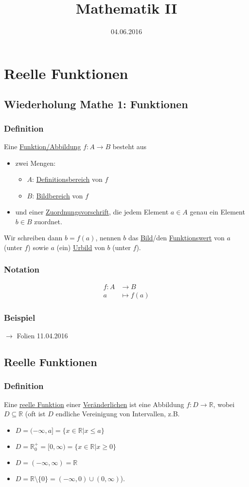 \documentclass[12pt, titlepage]{article}
\title{Mathematik II}
\date{04.06.2016}
\newcommand{\R}{\mathds{R}}
\renewcommand{\*}{\cdot}
\begin{document}
	\maketitle
	\tableofcontents
	\newpage
	\section{Reelle Funktionen}
	\subsection{Wiederholung Mathe 1: Funktionen}
	\subsubsection*{Definition}
		Eine \underline{Funktion/Abbildung} $f\colon A\rightarrow B$ besteht aus
		\begin{itemize}
			\item zwei Mengen:
			\begin{itemize}
				\item $A$: \underline{Definitionsbereich} von $f$
				\item $B$: \underline{Bildbereich} von $f$
			\end{itemize}
			\item und einer \underline{Zuordnungsvorschrift}, die jedem Element $a\in A$ genau ein Element $b\in B$ zuordnet.
		\end{itemize}
		Wir schreiben dann $b=f(a)$, nennen $b$ das \underline{Bild}/den \underline{Funktionswert} von $a$ (unter $f$) sowie $a$ (ein) \underline{Urbild} von $b$ (unter $f$).
	\subsubsection*{Notation}
		\vspace{-1cm}\begin{align*}
			f\colon A&\rightarrow B\\
			a&\mapsto f(a)
		\end{align*}
	\subsubsection*{Beispiel}
		$\rightarrow$ Folien 11.04.2016
	\subsection{Reelle Funktionen}
	\subsubsection*{Definition}
	Eine \underline{reelle Funktion} einer \underline{Veränderlichen} ist eine Abbildung $f\colon D\rightarrow \R$, wobei $D\subseteq \R$ (oft ist $D$ endliche Vereinigung von Intervallen, z.B.
	\begin{itemize}
		\item $ D=(-\infty,a]=\{x\in \R|x\leq a\} $
		\item $ D=\R^+_0=[0,\infty)=\{x\in\R|x\geq 0\}$
		\item $ D=(-\infty,\infty)=\R $
		\item $ D=\R\setminus\{0\}=(-\infty,0)\cup(0,\infty) $\hfill).
	\end{itemize}
\end{document}

